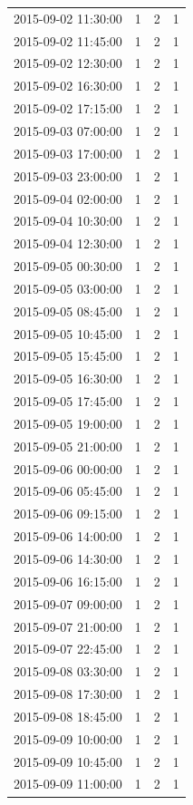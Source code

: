 \begin{tabular}{lrrr}
2015-09-02 11:30:00 & 1 & 2 & 1 \\
2015-09-02 11:45:00 & 1 & 2 & 1 \\
2015-09-02 12:30:00 & 1 & 2 & 1 \\
2015-09-02 16:30:00 & 1 & 2 & 1 \\
2015-09-02 17:15:00 & 1 & 2 & 1 \\
2015-09-03 07:00:00 & 1 & 2 & 1 \\
2015-09-03 17:00:00 & 1 & 2 & 1 \\
2015-09-03 23:00:00 & 1 & 2 & 1 \\
2015-09-04 02:00:00 & 1 & 2 & 1 \\
2015-09-04 10:30:00 & 1 & 2 & 1 \\
2015-09-04 12:30:00 & 1 & 2 & 1 \\
2015-09-05 00:30:00 & 1 & 2 & 1 \\
2015-09-05 03:00:00 & 1 & 2 & 1 \\
2015-09-05 08:45:00 & 1 & 2 & 1 \\
2015-09-05 10:45:00 & 1 & 2 & 1 \\
2015-09-05 15:45:00 & 1 & 2 & 1 \\
2015-09-05 16:30:00 & 1 & 2 & 1 \\
2015-09-05 17:45:00 & 1 & 2 & 1 \\
2015-09-05 19:00:00 & 1 & 2 & 1 \\
2015-09-05 21:00:00 & 1 & 2 & 1 \\
2015-09-06 00:00:00 & 1 & 2 & 1 \\
2015-09-06 05:45:00 & 1 & 2 & 1 \\
2015-09-06 09:15:00 & 1 & 2 & 1 \\
2015-09-06 14:00:00 & 1 & 2 & 1 \\
2015-09-06 14:30:00 & 1 & 2 & 1 \\
2015-09-06 16:15:00 & 1 & 2 & 1 \\
2015-09-07 09:00:00 & 1 & 2 & 1 \\
2015-09-07 21:00:00 & 1 & 2 & 1 \\
2015-09-07 22:45:00 & 1 & 2 & 1 \\
2015-09-08 03:30:00 & 1 & 2 & 1 \\
2015-09-08 17:30:00 & 1 & 2 & 1 \\
2015-09-08 18:45:00 & 1 & 2 & 1 \\
2015-09-09 10:00:00 & 1 & 2 & 1 \\
2015-09-09 10:45:00 & 1 & 2 & 1 \\
2015-09-09 11:00:00 & 1 & 2 & 1 \\

\end{tabular}
